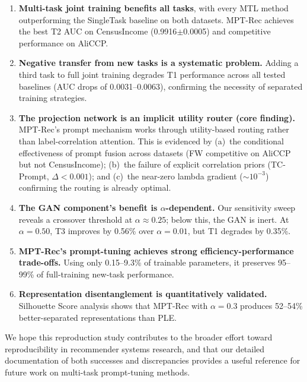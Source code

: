 \documentclass[review,anonymous]{acmart}
\begin{document}
\begin{enumerate}
  \item \textbf{Multi-task joint training benefits all tasks}, with every MTL
    method outperforming the SingleTask baseline on both datasets. MPT-Rec
    achieves the best T2 AUC on CensusIncome (0.9916$\pm$0.0005) and
    competitive performance on AliCCP.

  \item \textbf{Negative transfer from new tasks is a systematic problem.}
    Adding a third task to full joint training degrades T1 performance across
    all tested baselines (AUC drops of 0.0031--0.0063), confirming the necessity
    of separated training strategies.

  \item \textbf{The projection network is an implicit utility router (core finding).}
    MPT-Rec's prompt mechanism works through utility-based routing rather than
    label-correlation attention. This is evidenced by (a)~the conditional
    effectiveness of prompt fusion across datasets (FW competitive on AliCCP
    but not CensusIncome); (b)~the failure of explicit correlation priors
    (TC-Prompt, $\Delta < 0.001$); and (c)~the near-zero lambda gradient
    ($\sim10^{-3}$) confirming the routing is already optimal.

  \item \textbf{The GAN component's benefit is $\alpha$-dependent.} Our
    sensitivity sweep reveals a crossover threshold at $\alpha \approx 0.25$;
    below this, the GAN is inert. At $\alpha = 0.50$, T3 improves by 0.56\%
    over $\alpha=0.01$, but T1 degrades by 0.35\%.

  \item \textbf{MPT-Rec's prompt-tuning achieves strong efficiency-performance
    trade-offs.} Using only 0.15--9.3\% of trainable parameters, it preserves
    95--99\% of full-training new-task performance.

  \item \textbf{Representation disentanglement is quantitatively validated.}
    Silhouette Score analysis shows that MPT-Rec with $\alpha=0.3$ produces
    52--54\% better-separated representations than PLE.
\end{enumerate}

We hope this reproduction study contributes to the broader effort toward
reproducibility in recommender systems research, and that our detailed
documentation of both successes and discrepancies provides a useful reference
for future work on multi-task prompt-tuning methods.
\end{document}

